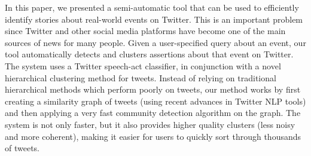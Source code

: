 \documentclass[letterpaper]{article}
\begin{document}
In this paper, we presented a semi-automatic tool that can be used to efficiently identify stories about real-world events on Twitter. This is an important problem since Twitter and other social media platforms have become one of the main sources of news for many people. %
Given a user-specified query about an event, our tool automatically detects and clusters assertions about that event on Twitter. The system uses a Twitter speech-act classifier, in conjunction with a novel hierarchical clustering method for tweets. Instead of relying on traditional hierarchical methods which perform  poorly on tweets, our method works by first creating a similarity graph of tweets (using recent advances in Twitter NLP tools) and then applying a very fast community detection algorithm on the graph. The system is not only faster, but it also provides higher quality clusters (less noisy and more coherent), making it easier for users to quickly sort through thousands of tweets.


\small


\end{document}
